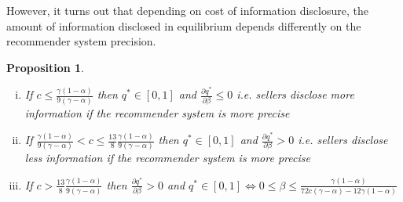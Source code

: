 \documentclass[a4paper]{article}
\newtheorem{proposition}[theorem]{Proposition}
\begin{document}
However, it turns out that depending on cost of information disclosure, the amount of information disclosed in equilibrium depends differently on the recommender system precision.



\begin{proposition}\label{thres_beta}
	\begin{enumerate}[(i)]
		\item If $c \le \frac{\gamma(1-\alpha)}{9(\gamma - \alpha)}$ then $q^* \in [0, 1]$ and $\frac{\partial q^*}{\partial \beta} \le 0$ i.e. sellers disclose more information if the recommender system is more precise
		\item If $\frac{\gamma(1-\alpha)}{9(\gamma - \alpha)} < c \le \frac{13}{8}\frac{\gamma(1-\alpha)}{9(\gamma - \alpha)}$ then $q^* \in [0, 1]$ and $\frac{\partial q^*}{\partial \beta} > 0$ i.e. sellers disclose less information if the recommender system is more precise
		\item If $c > \frac{13}{8}\frac{\gamma(1-\alpha)}{9(\gamma - \alpha)}$ then $\frac{\partial q^*}{\partial \beta} > 0$ and $q^* \in [0, 1] \iff 0 \le \beta \le \frac{\gamma(1-\alpha)}{72 c (\gamma - \alpha) - 12 \gamma (1-\alpha)}$ 
	\end{enumerate}
\end{proposition}
\end{document}

